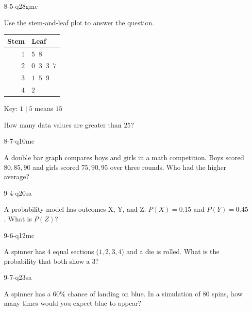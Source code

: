 \begin{practiceQuestion}{8-5-q28}{gmc}
\begin{questionText}
Use the stem-and-leaf plot to answer the question.

\begin{center}
\begin{tabular}{r|l}
\textbf{Stem} & \textbf{Leaf} \\
\hline
$1$ & $5\;\;8$ \\
$2$ & $0\;\;3\;\;3\;\;7$ \\
$3$ & $1\;\;5\;\;9$ \\
$4$ & $2$
\end{tabular}

Key: $1 \mid 5$ means $15$
\end{center}

How many data values are greater than $25$?
\end{questionText}
\end{practiceQuestion}

\begin{practiceQuestion}{8-7-q10}{mc}
\begin{questionText}
A double bar graph compares boys and girls in a math competition. Boys scored $80, 85, 90$ and girls scored $75, 90, 95$ over three rounds. Who had the higher average?
\end{questionText}
\end{practiceQuestion}

\begin{practiceQuestion}{9-4-q20}{sa}
\begin{questionText}
A probability model has outcomes X, Y, and Z. $P(X) = 0.15$ and $P(Y) = 0.45$. What is $P(Z)$?
\end{questionText}
\end{practiceQuestion}

\begin{practiceQuestion}{9-6-q12}{mc}
\begin{questionText}
A spinner has $4$ equal sections ($1, 2, 3, 4$) and a die is rolled. What is the probability that both show a $3$?
\end{questionText}
\end{practiceQuestion}

\begin{practiceQuestion}{9-7-q23}{sa}
\begin{questionText}
A spinner has a $60\%$ chance of landing on blue. In a simulation of $80$ spins, how many times would you expect blue to appear?
\end{questionText}
\end{practiceQuestion}
